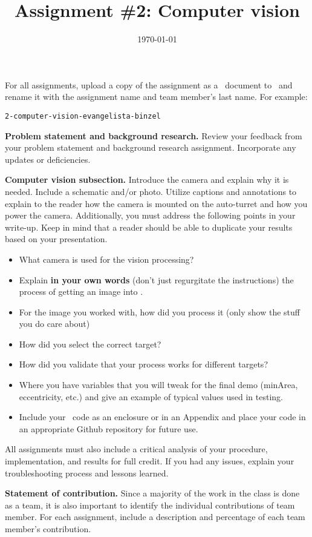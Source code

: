 \documentclass[noanswers]{exam}
\title{Assignment \#2: Computer vision}
\author{\usnaAuthorShort}
\date{\today}
\begin{document}
\maketitle

For all assignments, upload a copy of the assignment as a \Google\ document to \GoogleClassroom\ and rename it with the assignment name and team member’s last name.  For example:
\begin{lstlisting}
2-computer-vision-evangelista-binzel
\end{lstlisting}



\begin{questions}
\question
\textbf{Problem statement and background research.}  Review your feedback from your problem statement and background research assignment.  Incorporate any updates or deficiencies.

\question
\textbf{Computer vision subsection.} Introduce the camera and explain why it is needed.  Include a schematic and/or photo. Utilize captions and annotations to explain to the reader how the camera is mounted on the auto-turret and how you power the camera. Additionally, you must address the following points in your write-up.  Keep in mind that a reader should be able to duplicate your results based on your presentation.
\begin{itemize}
\item What camera is used for the vision processing?
\item Explain \textbf{in your own words} (don’t just regurgitate the instructions) the process of getting an image into \Matlab.  
\item For the image you worked with, how did you process it (only show the stuff you do care about)
\item How did you select the correct target?
\item How did you validate that your process works for different targets?
\item Where you have variables that you will tweak for the final demo (minArea, eccentricity, etc.) and give an example of typical values used in testing.
\item Include your \Matlab\ code as an enclosure or in an Appendix and place your code in an appropriate Github repository for future use.
\end{itemize}

All assignments must also include a critical analysis of your procedure, implementation, and results for full credit.  If you had any issues, explain your troubleshooting process and lessons learned.

\question
\textbf{Statement of contribution.} Since a majority of the work in the class is done as a team, it is also important to identify the individual contributions of team member.  For each assignment, include a description and percentage of each team member’s contribution. 
\end{questions}
\end{document}
